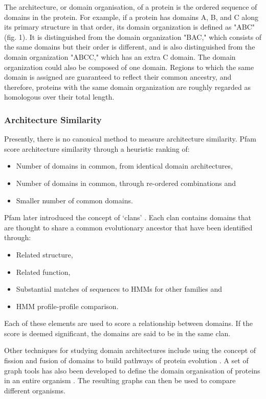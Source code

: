 The architecture, or domain organisation, of a protein is the ordered sequence of domains in the protein. For example, if a protein has domains A, B, and C along its primary structure in that order, its domain organization is defined as "ABC" (fig. 1). It is distinguished from the domain organization "BAC," which consists of the same domains but their order is different, and is also distinguished from the domain organization "ABCC," which has an extra C domain. The domain organization could also be composed of one domain. Regions to which the same domain is assigned are guaranteed to reflect their common ancestry, and therefore, proteins with the same domain organization are roughly regarded as homologous over their total length.

\subsubsection{Architecture Similarity}
Presently, there is no canonical method to measure architecture similarity. Pfam score architecture similarity through a heuristic ranking \cite{pfam2002} of:
\begin{itemize}
	\item Number of domains in common, from identical domain architectures,
	\item Number of domains in common, through re-ordered combinations and
	\item Smaller number of common domains.
\end{itemize}
Pfam later introduced the concept of `clans' \cite{pfamdb}. Each clan contains domains that are thought to share a common evolutionary ancestor that have been identified through:
\begin{itemize}
	\item Related structure,
	\item Related function,
	\item Substantial matches of sequences to HMMs for other families and
	\item HMM profile-profile comparison.
\end{itemize}
Each of these elements are used to score a relationship between domains. If the score is deemed significant, the domains are said to be in the same clan.

Other techniques for studying domain architectures include using the concept of fission and fusion of domains to build pathways of protein evolution \cite{fong}. A set of graph tools has also been developed to define the domain organisation of proteins in an entire organism \cite{cado}. The resulting graphs can then be used to compare different organisms.

